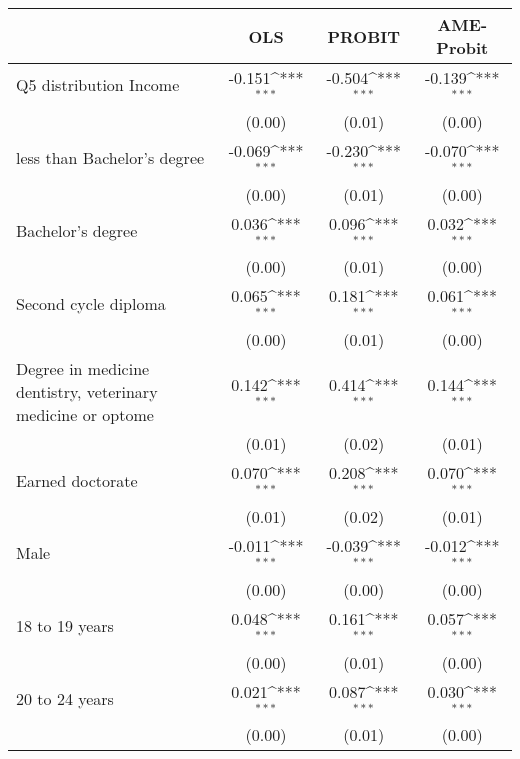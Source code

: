 {
\def\sym#1{\ifmmode^{#1}\else\(^{#1}\)\fi}
\begin{tabular}{l*{3}{c}}
\hline\hline
                    &\multicolumn{1}{c}{OLS}&\multicolumn{1}{c}{PROBIT}&\multicolumn{1}{c}{AME-Probit}\\
\hline
Q5 distribution Income&      -0.151\sym{***}&      -0.504\sym{***}&      -0.139\sym{***}\\
                    &      (0.00)         &      (0.01)         &      (0.00)         \\
less than Bachelor's degree&      -0.069\sym{***}&      -0.230\sym{***}&      -0.070\sym{***}\\
                    &      (0.00)         &      (0.01)         &      (0.00)         \\
Bachelor's degree   &       0.036\sym{***}&       0.096\sym{***}&       0.032\sym{***}\\
                    &      (0.00)         &      (0.01)         &      (0.00)         \\
Second cycle diploma&       0.065\sym{***}&       0.181\sym{***}&       0.061\sym{***}\\
                    &      (0.00)         &      (0.01)         &      (0.00)         \\
Degree in medicine dentistry, veterinary medicine or optome&       0.142\sym{***}&       0.414\sym{***}&       0.144\sym{***}\\
                    &      (0.01)         &      (0.02)         &      (0.01)         \\
Earned doctorate    &       0.070\sym{***}&       0.208\sym{***}&       0.070\sym{***}\\
                    &      (0.01)         &      (0.02)         &      (0.01)         \\
Male                &      -0.011\sym{***}&      -0.039\sym{***}&      -0.012\sym{***}\\
                    &      (0.00)         &      (0.00)         &      (0.00)         \\
18 to 19 years      &       0.048\sym{***}&       0.161\sym{***}&       0.057\sym{***}\\
                    &      (0.00)         &      (0.01)         &      (0.00)         \\
20 to 24 years      &       0.021\sym{***}&       0.087\sym{***}&       0.030\sym{***}\\
                    &      (0.00)         &      (0.01)         &      (0.00)         \\

\end{tabular}}
